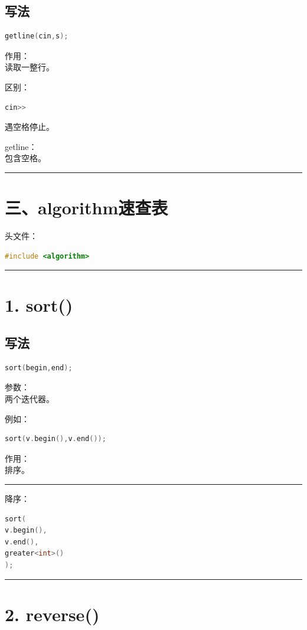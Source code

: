 \documentclass[9pt,twocolumn]{extarticle}
\begin{document}
\subsection{写法}
\begin{lstlisting}[language=C++]
getline(cin,s);
\end{lstlisting}
作用：\\
读取一整行。

区别：
\begin{lstlisting}[language=C++]
cin>>
\end{lstlisting}
遇空格停止。

getline：\\
包含空格。

\noindent\rule{\linewidth}{0.4pt}

\section{三、algorithm速查表}

头文件：
\begin{lstlisting}[language=C++]
#include <algorithm>
\end{lstlisting}

\noindent\rule{\linewidth}{0.4pt}

\section{1. sort()}

\subsection{写法}
\begin{lstlisting}[language=C++]
sort(begin,end);
\end{lstlisting}
参数：\\
两个迭代器。

例如：
\begin{lstlisting}[language=C++]
sort(v.begin(),v.end());
\end{lstlisting}
作用：\\
排序。

\noindent\rule{\linewidth}{0.4pt}

降序：
\begin{lstlisting}[language=C++]
sort(
v.begin(),
v.end(),
greater<int>()
);
\end{lstlisting}

\noindent\rule{\linewidth}{0.4pt}

\section{2. reverse()}
\end{document}

